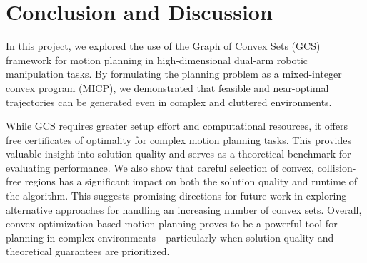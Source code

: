 \section{Conclusion and Discussion}\label{sec:conclusion}

In this project, we explored the use of the Graph of Convex Sets (GCS) framework for motion planning in high-dimensional dual-arm robotic manipulation tasks. By formulating the planning problem as a mixed-integer convex program (MICP), we demonstrated that feasible and near-optimal trajectories can be generated even in complex and cluttered environments.

While GCS requires greater setup effort and computational resources, it offers free certificates of optimality for complex motion planning tasks. This provides valuable insight into solution quality and serves as a theoretical benchmark for evaluating performance. We also show that careful selection of convex, collision-free regions has a significant impact on both the solution quality and runtime of the algorithm. This suggests promising directions for future work in exploring alternative approaches for handling an increasing number of convex sets. Overall, convex optimization-based motion planning proves to be a powerful tool for planning in complex environments---particularly when solution quality and theoretical guarantees are prioritized.